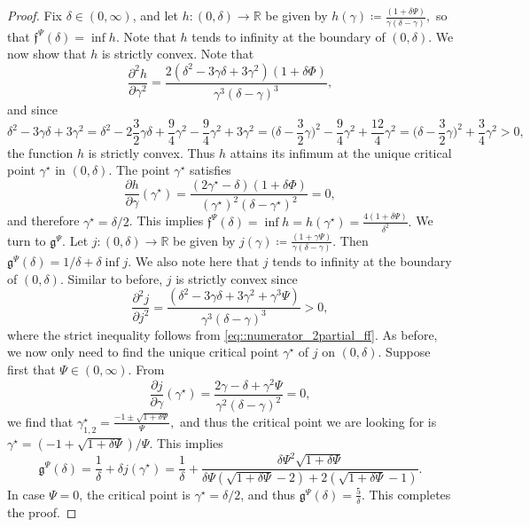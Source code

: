 \documentclass[10pt]{article} %
\newcommand\ff{\mathfrak f}
\newcommand\fg{\mathfrak g}
\def \R{\mathbb{R}}
\begin{document}
\begin{proof}
	Fix $\delta \in (0,\infty)$, and let $h : (0,\delta) \rightarrow \R$ be given by $h(\gamma) \coloneqq \frac{(1+\delta\Psi)}{\gamma(\delta-\gamma)},$ so that $\ff^\Psi(\delta) = \inf h$. Note that $h$ tends to infinity at the boundary of $(0,\delta)$. We now show that $h$ is strictly convex. Note that 
	\begin{equation*}
		\frac{\partial^2h}{\partial \gamma^2} = \frac{2(\delta^2 - 3\gamma\delta + 3 \gamma^2)(1+\delta\Phi)}{\gamma^3(\delta-\gamma)^3},
	\end{equation*}
	and since
	\begin{equation}\label{eq::numerator_2partial_ff}
		\delta^2-3\gamma\delta + 3\gamma^2 = \delta^2 - 2 \frac{3}{2}\gamma \delta + \frac{9}{4}\gamma^2 - \frac{9}{4}\gamma^2 + 3\gamma^2 = \bigg(\delta - \frac{3}{2}\gamma\bigg)^2 - \frac{9}{4}\gamma^2 + \frac{12}{4}\gamma^2 = \bigg(\delta - \frac{3}{2}\gamma\bigg)^2 + \frac{3}{4}\gamma^2 > 0,
	\end{equation}
	the function $h$ is strictly convex. Thus $h$ attains its infimum at the unique critical point $\gamma^\star$ in $(0,\delta)$. The point $\gamma^\star$ satisfies
	\begin{equation*}
		\frac{\partial h}{\partial \gamma} (\gamma^\star) = \frac{(2\gamma^\star- \delta)(1+\delta\Phi)}{(\gamma^\star)^2(\delta-\gamma^\star)^2} = 0,
	\end{equation*}
	and therefore $\gamma^\star = \delta/2$. This implies $\ff^\Psi(\delta) = \inf h = h(\gamma^\star) = \frac{4(1+\delta\Psi)}{\delta^2}.$ We turn to $\fg^\Psi$. Let $j : (0,\delta) \longrightarrow \R$ be given by $j(\gamma) \coloneqq \frac{(1+\gamma\Psi)}{\gamma(\delta-\gamma)}.$ Then $\fg^\Psi(\delta) = 1/\delta + \delta \inf j$. We also note here that $j$ tends to infinity at the boundary of $(0,\delta)$. Similar to before, $j$ is strictly convex since
	\begin{equation*}
		\frac{\partial^2 j}{\partial j^2} = \frac{(\delta^2-3\gamma\delta + 3\gamma^2 + \gamma^3\Psi)}{\gamma^3(\delta-\gamma)^3} > 0,
	\end{equation*}
	where the strict inequality follows from \eqref{eq::numerator_2partial_ff}. As before, we now only need to find the unique critical point $\gamma^\star$ of $j$ on $(0,\delta)$. Suppose first that $\Psi \in (0,\infty)$. From
	\begin{equation*}
		\frac{\partial j}{\partial \gamma}(\gamma^\star) = \frac{2\gamma - \delta + \gamma^2\Psi}{\gamma^2(\delta-\gamma)^2} = 0,
	\end{equation*}
	we find that $\gamma^\star_{1,2} = \frac{-1 \pm \sqrt{1+\delta\Psi}}{\Psi},$ and thus the critical point we are looking for is $\gamma^\star = (-1 +\sqrt{1+\delta\Psi})/\Psi$. This implies
	\begin{equation*}
		\fg^\Psi(\delta) = \frac{1}{\delta} + \delta j(\gamma^\star) = \frac{1}{\delta} + \frac{\delta\Psi^2\sqrt{1+\delta\Psi}}{\delta\Psi(\sqrt{1+\delta\Psi} - 2) + 2(\sqrt{1+\delta\Psi}-1)}.
	\end{equation*}
	In case $\Psi = 0$, the critical point is $\gamma^\star = \delta/2$, and thus $\fg^\Psi(\delta) = \frac{5}{\delta}.$ This completes the proof.
\end{proof}
\end{document}
